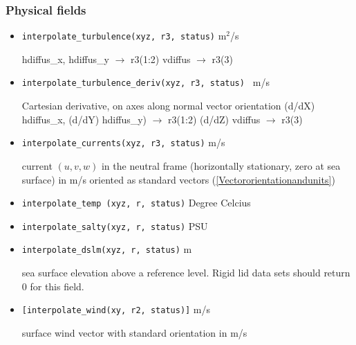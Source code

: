 \subsubsection{Physical fields}

\begin{itemize}
  \item {\tt interpolate\_turbulence(xyz, r3, status)}  m$^2$/s  \newline 
              
        hdiffus\_x, hdiffus\_y $\rightarrow$ r3(1:2)  \newline
        vdiffus                $\rightarrow$ r3(3)  \newline
         
  \item {\tt interpolate\_turbulence\_deriv(xyz, r3, status) } m/s      \newline

        Cartesian derivative, on axes along normal vector orientation \newline
        (d/dX) hdiffus\_x, (d/dY) hdiffus\_y) $\rightarrow$ r3(1:2)  \newline
        (d/dZ) vdiffus          $\rightarrow$ r3(3)  \newline
  
  \item {\tt interpolate\_currents(xyz, r3, status)} m/s \newline
                   
    current $(u,v,w)$ in the neutral frame (horizontally stationary, zero at sea surface)
    in m/s oriented as standard vectors (\ref{Vectororientationandunits}) 
           
  \item {\tt interpolate\_temp (xyz, r, status)} Degree Celcius   \newline       
  \item {\tt interpolate\_salty(xyz, r, status)} PSU              \newline

  \item {\tt interpolate\_dslm(xyz, r, status)}  m                \newline

    sea surface elevation above a reference level. Rigid lid
    data sets should return 0 for this field. 
      
  \item {\tt [interpolate\_wind(xy, r2, status)]} m/s \newline
 
    surface wind vector with standard orientation in m/s


\end{itemize}



